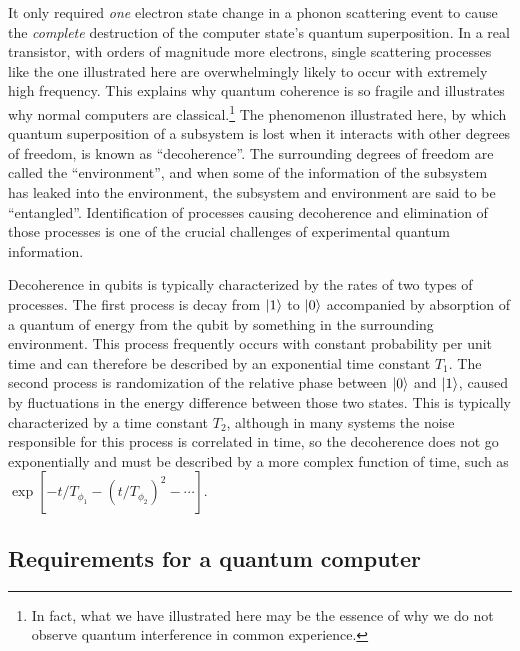 It only required \emph{one} electron state change in a phonon scattering event to cause the \emph{complete} destruction of the computer state's quantum superposition.
In a real transistor, with orders of magnitude more electrons, single scattering processes like the one illustrated here are overwhelmingly likely to occur with extremely high frequency.
This explains why quantum coherence is so fragile and illustrates why normal computers are classical.\footnote{In fact, what we have illustrated here may be the essence of why we do not observe quantum interference in common experience.}
The phenomenon illustrated here, by which quantum superposition of a subsystem is lost when it interacts with other degrees of freedom, is known as ``decoherence''.
The surrounding degrees of freedom are called the ``environment'', and when some of the information of the subsystem has leaked into the environment, the subsystem and environment are said to be ``entangled''.
Identification of processes causing decoherence and elimination of those processes is one of the crucial challenges of experimental quantum information.

Decoherence in qubits is typically characterized by the rates of two types of processes.
The first process is decay from $|1\rangle$ to $|0\rangle$ accompanied by absorption of a quantum of energy from the qubit by something in the surrounding environment.
This process frequently occurs with constant probability per unit time and can therefore be described by an exponential time constant $T_1$.
The second process is randomization of the relative phase between $|0\rangle$ and $|1\rangle$, caused by fluctuations in the energy difference between those two states.
This is typically characterized by a time constant $T_2$, although in many systems the noise responsible for this process is correlated in time, so the decoherence does not go exponentially and must be described by a more complex function of time, such as $\exp \left[ -t/T_{\phi_1} - (t/T_{\phi_2})^2 - \cdots \right]$.

\subsection{Requirements for a quantum computer}

